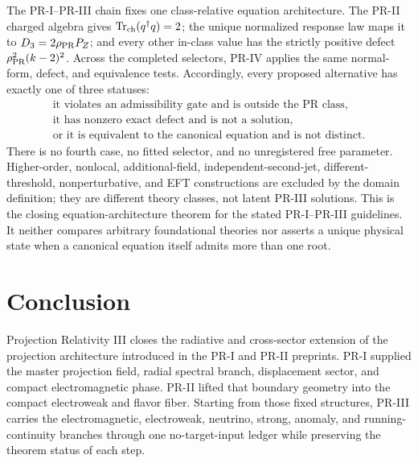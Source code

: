 \documentclass[11pt]{article}
\begin{document}
The PR-I--PR-III chain fixes one class-relative equation architecture.  The PR-II charged algebra gives \(\operatorname{Tr}_{\rm ch}(q^\dagger q)=2\); the unique normalized response law maps it to \(D_3=2\rho_{\rm PR}P_Z\); and every other in-class value has the strictly positive defect \(\rho_{\rm PR}^2(k-2)^2\).  Across the completed selectors, PR-IV applies the same normal-form, defect, and equivalence tests. Accordingly, every proposed alternative has exactly one of three statuses:
\begin{equation}
\boxed{
\begin{gathered}
\text{it violates an admissibility gate and is outside the PR class},\\
\text{it has nonzero exact defect and is not a solution},\\
\text{or it is equivalent to the canonical equation and is not distinct}.
\end{gathered}
}
\label{eq:priii-trichotomy}
\end{equation}
There is no fourth case, no fitted selector, and no unregistered free parameter.  Higher-order, nonlocal, additional-field, independent-second-jet, different-threshold, nonperturbative, and EFT constructions are excluded by the domain definition; they are different theory classes, not latent PR-III solutions.  This is the closing equation-architecture theorem for the stated PR-I--PR-III guidelines.  It neither compares arbitrary foundational theories nor asserts a unique physical state when a canonical equation itself admits more than one root.


\section{Conclusion}
\label{sec:priii-conclusion}

Projection Relativity III closes the radiative and cross-sector extension of the projection architecture introduced in the PR-I and PR-II preprints.  PR-I supplied the master projection field, radial spectral branch, displacement sector, and compact electromagnetic phase.  PR-II lifted that boundary geometry into the compact electroweak and flavor fiber.  Starting from those fixed structures, PR-III carries the electromagnetic, electroweak, neutrino, strong, anomaly, and running-continuity branches through one no-target-input ledger while preserving the theorem status of each step.
\end{document}
